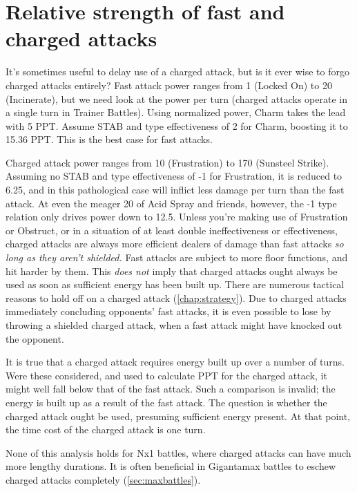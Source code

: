 \section{Relative strength of fast and charged attacks\label{sec:fastvchaged}}
It's sometimes useful to delay use of a charged attack, but is it ever wise to forgo
  charged attacks entirely?
Fast attack power ranges from 1 (Locked On) to 20 (Incinerate), but we need look at
  the power per turn (charged attacks operate in a single turn in Trainer Battles).
Using normalized power, Charm takes the lead with 5 PPT\@.
Assume STAB and type effectiveness of 2 for Charm, boosting it to 15.36 PPT\@.
This is the best case for fast attacks.

Charged attack power ranges from 10 (Frustration) to 170 (Sunsteel Strike).
Assuming no STAB and type effectiveness of -1 for Frustration, it is reduced to 6.25,
  and in this pathological case will inflict less damage per turn than the fast attack.
At even the meager 20 of Acid Spray and friends, however, the -1 type relation only
  drives power down to 12.5.
Unless you're making use of Frustration or Obstruct,
  or in a situation of at least double ineffectiveness or effectiveness,
  charged attacks are always more efficient dealers of damage than fast attacks \textit{so long
  as they aren't shielded.}
Fast attacks are subject to more floor functions, and hit harder by them.
This \textit{does not} imply that charged attacks ought always be used as soon as
  sufficient energy has been built up.
There are numerous tactical reasons to hold off on a charged attack (\autoref{chap:strategy}).
Due to charged attacks immediately concluding opponents' fast attacks,
 it is even possible to lose by throwing a shielded charged attack, when
 a fast attack might have knocked out the opponent.

It is true that a charged attack requires energy built up over a number of turns.
Were these considered, and used to calculate PPT for the charged attack,
  it might well fall below that of the fast attack.
Such a comparison is invalid; the energy is built up as a result of the fast attack.
The question is whether the charged attack ought be used, presuming sufficient energy present.
At that point, the time cost of the charged attack is one turn.

None of this analysis holds for Nx1 battles, where charged attacks can have much more lengthy durations.
It is often beneficial in Gigantamax battles to eschew charged attacks completely (\autoref{sec:maxbattles}).
